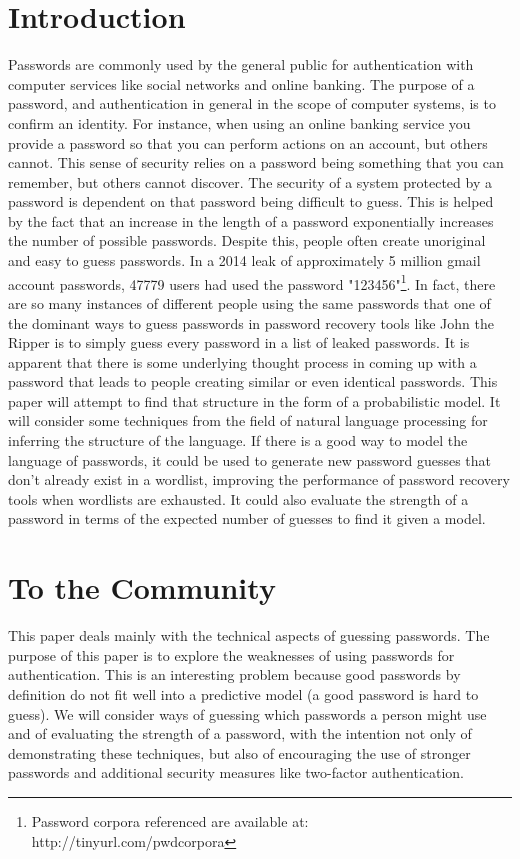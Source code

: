 \documentclass{amsart}
\theoremstyle{definition}
\theoremstyle{remark}
\numberwithin{equation}{section}
\begin{document}
\section{Introduction}
Passwords are commonly used by the general public for authentication with computer services like social networks and online banking. The purpose of a password, and authentication in general in the scope of computer systems, is to confirm an identity. For instance, when using an online banking service you provide a password so that you can perform actions on an account, but others cannot. This sense of security relies on a password being something that you can remember, but others cannot discover. The security of a system protected by a password is dependent on that password being difficult to guess. This is helped by the fact that an increase in the length of a password exponentially increases the number of possible passwords. Despite this, people often create unoriginal and easy to guess passwords. In a 2014 leak of approximately 5 million gmail account passwords, 47779 users had used the password "123456"\footnote{Password corpora referenced are available at: http://tinyurl.com/pwdcorpora}. In fact, there are so many instances of different people using the same passwords that one of the dominant ways to guess passwords in password recovery tools like John the Ripper is to simply guess every password in a list of leaked passwords. It is apparent that there is some underlying thought process in coming up with a password that leads to people creating similar or even identical passwords. This paper will attempt to find that structure in the form of a probabilistic model. It will consider some techniques from the field of natural language processing for inferring the structure of the language. If there is a good way to model the language of passwords, it could be used to generate new password guesses that don't already exist in a wordlist, improving the performance of password recovery tools when wordlists are exhausted. It could also evaluate the strength of a password in terms of the expected number of guesses to find it given a model.

\section{To the Community}
This paper deals mainly with the technical aspects of guessing passwords. The purpose of this paper is to explore the weaknesses of using passwords for authentication. This is an interesting problem because good passwords by definition do not fit well into a predictive model (a good password is hard to guess). We will consider ways of guessing which passwords a person might use and of evaluating the strength of a password, with the intention not only of demonstrating these techniques, but also of encouraging the use of stronger passwords and additional security measures like two-factor authentication.
\end{document}
